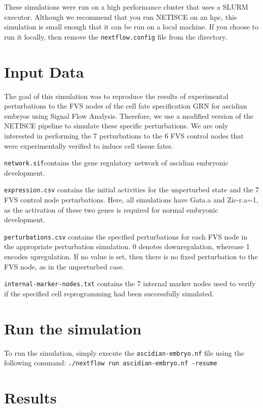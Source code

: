 \documentclass[
]{book}
\begin{document}
These simulations were run on a high performance cluster that uses a SLURM executor. Although we recommend that you run NETISCE on an hpc, this simulation is small enough that it can be run on a local machine. If you choose to run it locally, then remove the \texttt{nextflow.config} file from the directory.

\hypertarget{input-data}{%
\section{Input Data}\label{input-data}}

The goal of this simulation was to reproduce the results of experimental perturbations to the FVS nodes of the cell fate specification GRN for ascidian embryos using Signal Flow Analysis. Therefore, we use a modified version of the NETISCE pipeline to simulate these specific perturbations.
We are only interested in performing the 7 perturbations to the 6 FVS control nodes that were experimentally verified to induce cell tissue fates.

\texttt{network.sif}contains the gene regulatory network of ascidian embryonic development.

\texttt{expression.csv} contains the initial activities for the unperturbed state and the 7 FVS control node perturbations. Here, all simulations have Gata.a and Zic-r.a=1, as the activation of these two genes is required for normal embryonic development.

\texttt{perturbations.csv} contains the specified perturbations for each FVS node in the appropriate perturbation simulation. 0 denotes downregulation, wherease 1 encodes upregulation. If no value is set, then there is no fixed perturbation to the FVS node, as in the unperturbed case.

\texttt{internal-marker-nodes.txt} contains the 7 internal marker nodes used to verify if the specified cell reprogramming had been successfully simulated.

\hypertarget{run-the-simulation}{%
\section{Run the simulation}\label{run-the-simulation}}

To run the simulation, simply execute the \texttt{ascidian-embryo.nf} file using the following command: \texttt{./nextflow\ run\ ascidian-embryo.nf\ -resume}

\hypertarget{results}{%
\section{Results}\label{results}}
\end{document}
